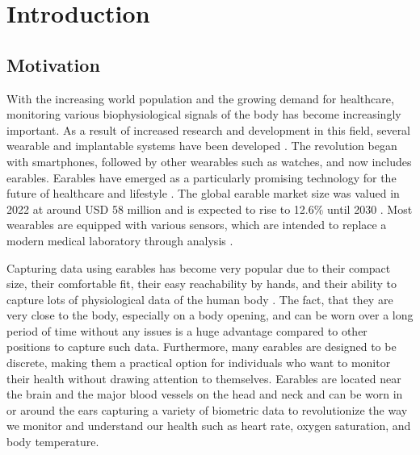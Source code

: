 \chapter{Introduction}
\label{ch:Introduction}

\section{Motivation}
With the increasing world population and the growing demand for healthcare, monitoring various biophysiological signals of the body has become increasingly important. 
As a result of increased research and development in this field, several wearable and implantable systems have been developed \cite{loncar-turukaloLiteratureWearableTechnology2019}.
The revolution began with smartphones, followed by other wearables such as watches, and now includes earables.
Earables have emerged as a particularly promising technology for the future of healthcare and lifestyle \cite{trespGoingDigitalSurvey2016, kirkWearablesRevolutionStandardization2014a}. 
The global earable market size was valued in 2022 at around USD 58 million and is expected to rise to 12.6\% until 2030 \cite{GlobalEarphonesHeadphones2018}.
Most wearables are equipped with various sensors, which are intended to replace a modern medical laboratory through analysis \cite{loncar-turukaloLiteratureWearableTechnology2019}.

Capturing data using earables has become very popular due to their compact size, their comfortable fit, their easy reachability by hands, and their ability to capture lots of physiological data of the human body \cite{roddigerSensingEarablesSystematic2022a}. 
The fact, that they are very close to the body, especially on a body opening, and can be worn over a long period of time without any issues is a huge advantage compared to other positions to capture such data.
Furthermore, many earables are designed to be discrete, making them a practical option for individuals who want to monitor their health without drawing attention to themselves.
Earables are located near the brain and the major blood vessels on the head and neck and can be worn in or around the ears capturing a variety of biometric data to revolutionize the way we monitor and understand our health such as heart rate, oxygen saturation, and body temperature.

